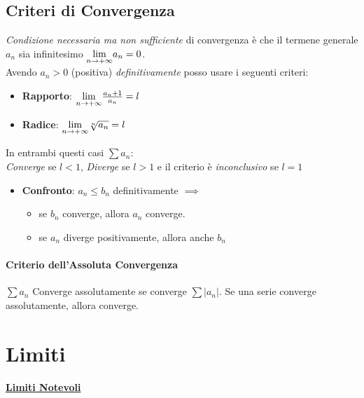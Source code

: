 \documentclass[12pt, a4paper]{article}
\begin{document}
\subsection*{Criteri di Convergenza}

\emph{Condizione necessaria ma non sufficiente} di convergenza è che il termene generale $a_n$ sia infinitesimo $\underset{n \to +\infty}{\lim} a_n = 0$.
\\Avendo $a_n>0$ (positiva) \emph{definitivamente} posso usare i seguenti criteri:
\begin{itemize}
	\item \textbf{Rapporto}: $\underset{n \to +\infty}{\lim} \frac{a_n+1}{a_n} = l$
	\item \textbf{Radice}: $\underset{n \to +\infty}{\lim} \sqrt[n]{a_n} = l$
\end{itemize}
In entrambi questi casi $\sum a_n$:\\
\emph{Converge} se $l<1$, \emph{Diverge} se $l>1$ e il criterio è \emph{inconclusivo} se $l=1$

\begin{itemize}
	\item \textbf{Confronto}: $a_n\leq b_n$ definitivamente $\implies$
	      \begin{itemize}
		      \item se $b_n$ converge, allora $a_n$ converge.
		      \item se $a_n$ diverge positivamente, allora anche $b_n$
	      \end{itemize}
\end{itemize}

\paragraph*{Criterio dell'Assoluta Convergenza}
$\sum a_n$ Converge assolutamente se converge $\sum |a_n|$.
Se una serie converge assolutamente, allora converge.

\section*{Limiti}

	\paragraph*{\underline{Limiti Notevoli}}
\end{document}
